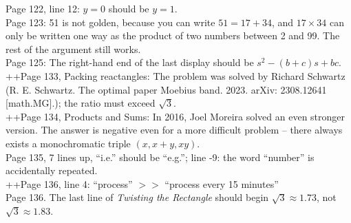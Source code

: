 \documentclass[11pt]{article}
\begin{document}
Page 122, line 12: $y=0$ should be $y=1$.\\

Page 123: 51 is not golden, because you can write $51=17+34$, and $17 \times 34$ can only be written one
way as the product of two numbers between 2 and 99.  The rest of the argument still works.\\

Page 125: The right-hand end of the last display should be $s^2-(b+c)s+bc$.\\

++Page 133, Packing reactangles: The problem was solved by Richard Schwartz (R. E. Schwartz. The optimal paper Moebius band. 2023. arXiv: 2308.12641 [math.MG].); the ratio must exceed $\sqrt{3}$.\\

++Page 134, Products and Sums: In 2016, Joel Moreira solved an even stronger version. The answer is negative even for a more difficult problem – there always exists a monochromatic triple $ (x, x + y, xy)$.\\

Page 135, 7 lines up,  ``i.e.'' should be ``e.g.'';
line -9: the word ``number'' is accidentally repeated.\\

++Page 136, line 4: ``process'' $>>$ ``process every 15 minutes''\\

Page 136. The last line of {\em Twisting the Rectangle} should begin $\sqrt{3}\approx 1.73$, not
$\sqrt{3}\approx 1.83$.
\end{document}
